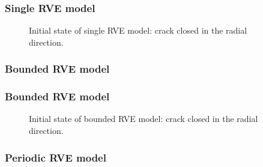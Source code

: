 \documentclass[first,firstsupp,lastsupp,handout,last,hyperref,table]{ETHclass}
\begin{document}
\begin{frame}
\frametitle{Single RVE model}
\vspace{-0.75cm}
\centering
\begin{figure}[!h]
\centering
  \caption{\scriptsize Initial state of single RVE model: crack closed in the radial direction.}
  \label{fig:singleRVE_onlycc}
\end{figure}
\end{frame}


\begin{frame}
\frametitle{Bounded RVE model}
\vspace{-0.75cm}
\centering
\begin{figure}[!h]
\centering
{}\quad
{}
  \label{fig:boundedRVE_ccoc}
\end{figure}
\end{frame}

\begin{frame}
\frametitle{Bounded RVE model}
\vspace{-0.75cm}
\centering
\begin{figure}[!h]
\centering
  \caption{\scriptsize Initial state of bounded RVE model: crack closed in the radial direction.}
  \label{fig:boundedRVE_onlycc}
\end{figure}
\end{frame}

\begin{frame}
\frametitle{Periodic RVE model}
\vspace{-0.5cm}
\centering
\begin{figure}[!h]
\centering
{}\quad
{}
  \label{fig:periodicRVE_ccoc}
\end{figure}
\end{frame}
\end{document}
